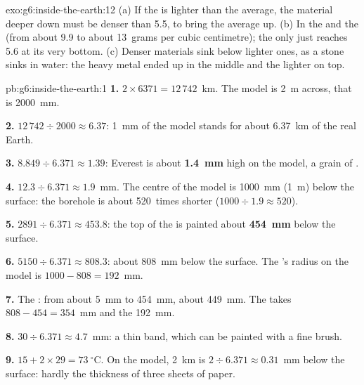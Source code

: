 \begin{solution}{exo:g6:inside-the-earth:12}
(a) If the  is lighter than the average, the material deeper down must
be denser than 5.5, to bring the average up. (b) In the  and the
 (from about 9.9 to about 13~grams per cubic centimetre); the
 only just reaches 5.6 at its very bottom. (c) Denser materials sink
below lighter ones, as a stone sinks in water: the heavy metal ended up in
the middle and the lighter  on top.
\end{solution}

\begin{solution}{pb:g6:inside-the-earth:1}
\textbf{1.} $2 \times 6371 = 12\,742$~km. The model is 2~m across, that is
2000~mm.

\textbf{2.} $12\,742 \div 2000 \approx 6.37$: 1~mm of the model stands for
about 6.37~km of the real Earth.

\textbf{3.} $8.849 \div 6.371 \approx 1.39$: Everest is about
\textbf{1.4~mm} high on the model, a grain of .

\textbf{4.} $12.3 \div 6.371 \approx 1.9$~mm. The centre of the model is
1000~mm (1~m) below the surface: the borehole is about 520~times shorter
($1000 \div 1.9 \approx 520$).

\textbf{5.} $2891 \div 6.371 \approx 453.8$: the top of the  is
painted about \textbf{454~mm} below the surface.

\textbf{6.} $5150 \div 6.371 \approx 808.3$: about 808~mm below the
surface. The 's radius on the model is $1000 - 808 = 192$~mm.

\textbf{7.} The : from about 5~mm to 454~mm, about 449~mm. The  takes $808 - 454 = 354$~mm and the  192~mm.

\textbf{8.} $30 \div 6.371 \approx 4.7$~mm: a thin band, which can be
painted with a fine brush.

\textbf{9.} $15 + 2 \times 29 = 73~^\circ$C. On the model, 2~km is
$2 \div 6.371 \approx 0.31$~mm below the surface: hardly the thickness of
three sheets of paper.


\end{solution}
